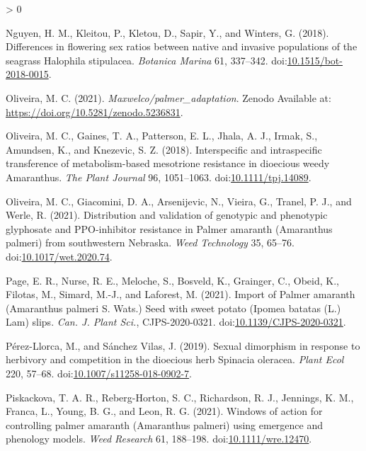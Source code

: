 \documentclass[utf8]{frontiersSCNS}
\newlength{\cslhangindent}
\newenvironment{CSLReferences}[2] %
 {%
  \setlength{\parindent}{0pt}
  \ifodd #1 \everypar{\setlength{\hangindent}{\cslhangindent}}\ignorespaces\fi
  \ifnum #2 > 0
  \setlength{\parskip}{#2\baselineskip}
  \fi
 }%
 {}
\begin{document}
\begin{CSLReferences}{1}{0}
\leavevmode\hypertarget{ref-nguyen2018}{}%
Nguyen, H. M., Kleitou, P., Kletou, D., Sapir, Y., and Winters, G.
(2018). Differences in flowering sex ratios between native and invasive
populations of the seagrass {Halophila} stipulacea. \emph{Botanica
Marina} 61, 337--342.
doi:\href{https://doi.org/10.1515/bot-2018-0015}{10.1515/bot-2018-0015}.

\leavevmode\hypertarget{ref-oliveira2021b}{}%
Oliveira, M. C. (2021). \emph{Maxwelco/palmer\_adaptation}. {Zenodo}
Available at: \url{https://doi.org/10.5281/zenodo.5236831}.

\leavevmode\hypertarget{ref-oliveira2018}{}%
Oliveira, M. C., Gaines, T. A., Patterson, E. L., Jhala, A. J., Irmak,
S., Amundsen, K., and Knezevic, S. Z. (2018). Interspecific and
intraspecific transference of metabolism-based mesotrione resistance in
dioecious weedy {Amaranthus}. \emph{The Plant Journal} 96, 1051--1063.
doi:\href{https://doi.org/10.1111/tpj.14089}{10.1111/tpj.14089}.

\leavevmode\hypertarget{ref-oliveira2021a}{}%
Oliveira, M. C., Giacomini, D. A., Arsenijevic, N., Vieira, G., Tranel,
P. J., and Werle, R. (2021). Distribution and validation of genotypic
and phenotypic glyphosate and {PPO}-inhibitor resistance in {Palmer}
amaranth ({Amaranthus} palmeri) from southwestern {Nebraska}. \emph{Weed
Technology} 35, 65--76.
doi:\href{https://doi.org/10.1017/wet.2020.74}{10.1017/wet.2020.74}.

\leavevmode\hypertarget{ref-page2021}{}%
Page, E. R., Nurse, R. E., Meloche, S., Bosveld, K., Grainger, C.,
Obeid, K., Filotas, M., Simard, M.-J., and Laforest, M. (2021). Import
of {Palmer} amaranth ({Amaranthus} palmeri {S}. {Wats}.) Seed with sweet
potato ({Ipomea} batatas ({L}.) {Lam}) slips. \emph{Can. J. Plant Sci.},
CJPS-2020-0321.
doi:\href{https://doi.org/10.1139/CJPS-2020-0321}{10.1139/CJPS-2020-0321}.

\leavevmode\hypertarget{ref-perez-llorca2019}{}%
Pérez-Llorca, M., and Sánchez Vilas, J. (2019). Sexual dimorphism in
response to herbivory and competition in the dioecious herb {Spinacia}
oleracea. \emph{Plant Ecol} 220, 57--68.
doi:\href{https://doi.org/10.1007/s11258-018-0902-7}{10.1007/s11258-018-0902-7}.

\leavevmode\hypertarget{ref-piskackova2021}{}%
Piskackova, T. A. R., Reberg-Horton, S. C., Richardson, R. J., Jennings,
K. M., Franca, L., Young, B. G., and Leon, R. G. (2021). Windows of
action for controlling palmer amaranth ({Amaranthus} palmeri) using
emergence and phenology models. \emph{Weed Research} 61, 188--198.
doi:\href{https://doi.org/10.1111/wre.12470}{10.1111/wre.12470}.


\end{CSLReferences}
\end{document}
